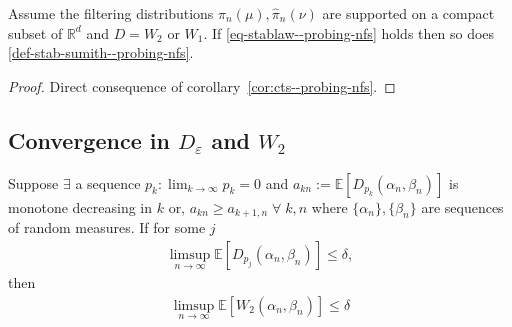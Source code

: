 \begin{thm} Assume the filtering distributions $\hat\pi_n(\mu),\hat\pi_n(\nu)$ are supported on a compact subset of $\mathbb R^d$ and $D=W_2$ or $W_1$. If \eqref{eq-stablaw--probing-nfs} holds then so does \eqref{def-stab-sumith--probing-nfs}.
\begin{proof}
Direct consequence of corollary~\ref{cor:cts--probing-nfs}.
\end{proof}
\label{thm:strength--probing-nfs}
\end{thm}
{\color{mypink}\subsection{Convergence in \texorpdfstring{$D_\varepsilon$}{Lg} and \texorpdfstring{$W_2$}{Lg}}\label{ssec-dw--probing-nfs}
\begin{thm} Suppose 
$\exists$ a sequence $p_k: \lim_{k\to\infty}p_k=0$ and $  a_{kn}:=\mathbb E[D_{p_k}(\alpha_n, \beta_n)]$ is monotone decreasing in $k$ or, 
$a_{kn} \ge a_{k+1,  n}\;\forall\; k, n$ where $\{\alpha_n\}, \{\beta_n\}$ are sequences of random measures. If for some $j$
\begin{align}
    \limsup_{n\to\infty}\mathbb E[D_{p_j}(\alpha_n, \beta_n)] \le \delta,
\end{align}
then
\begin{align}\limsup_{n\to\infty}\mathbb E[W_2 (\alpha_n, \beta_n)]\le\delta
\end{align}


\end{thm}}
